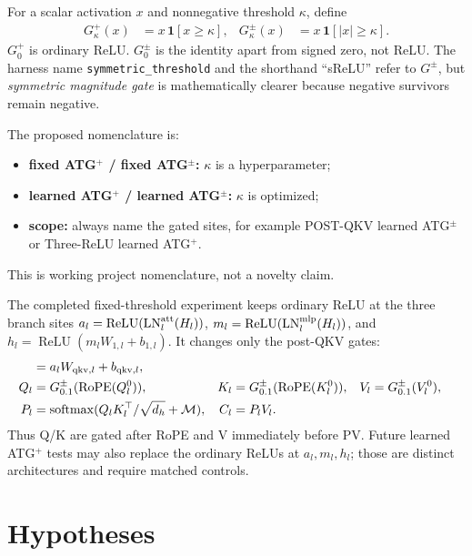 \documentclass[10pt]{article}
\newcommand{\code}[1]{\texttt{#1}}
\newcommand{\tightsection}[1]{\section{#1}\vspace{-0.35em}}
\begin{document}
For a scalar activation $x$ and nonnegative threshold $\kappa$, define
\begin{align}
G^+_{\kappa}(x) &= x\,\mathbf{1}[x\geq\kappa],
&G^{\pm}_{\kappa}(x) &= x\,\mathbf{1}[|x|\geq\kappa].
\label{eq:gates}
\end{align}
$G^+_0$ is ordinary ReLU. $G^{\pm}_0$ is the identity apart from signed zero, not ReLU. The harness name \code{symmetric\_threshold} and the shorthand ``sReLU'' refer to $G^{\pm}$, but \emph{symmetric magnitude gate} is mathematically clearer because negative survivors remain negative.

The proposed nomenclature is:
\begin{itemize}
\item \textbf{fixed ATG$^+$ / fixed ATG$^{\pm}$:} $\kappa$ is a hyperparameter;
\item \textbf{learned ATG$^+$ / learned ATG$^{\pm}$:} $\kappa$ is optimized;
\item \textbf{scope:} always name the gated sites, for example POST-QKV learned ATG$^{\pm}$ or Three-ReLU learned ATG$^+$.
\end{itemize}
This is working project nomenclature, not a novelty claim.

The completed fixed-threshold experiment keeps ordinary ReLU at the three branch sites
\(a_l=\operatorname{ReLU}(\operatorname{LN}^{\rm att}_l(H_l))\),
\(m_l=\operatorname{ReLU}(\operatorname{LN}^{\rm mlp}_l(H_l))\), and
\(h_l=\operatorname{ReLU}(m_lW_{1,l}+b_{1,l})\). It changes only the post-QKV gates:
\begin{align*}
[Q_l^0,K_l^0,V_l^0] &= a_lW_{{\rm qkv},l}+b_{{\rm qkv},l},\\
Q_l &= G^{\pm}_{0.1}(\operatorname{RoPE}(Q_l^0)),
&K_l &= G^{\pm}_{0.1}(\operatorname{RoPE}(K_l^0)),
&V_l &= G^{\pm}_{0.1}(V_l^0),\\
P_l &= \operatorname{softmax}(Q_lK_l^\top/\sqrt{d_h}+\mathcal{M}),
&C_l &= P_lV_l.
\end{align*}
Thus Q/K are gated after RoPE and V immediately before PV. Future learned ATG$^+$ tests may also replace the ordinary ReLUs at $a_l,m_l,h_l$; those are distinct architectures and require matched controls.

\tightsection{Hypotheses}
\end{document}
